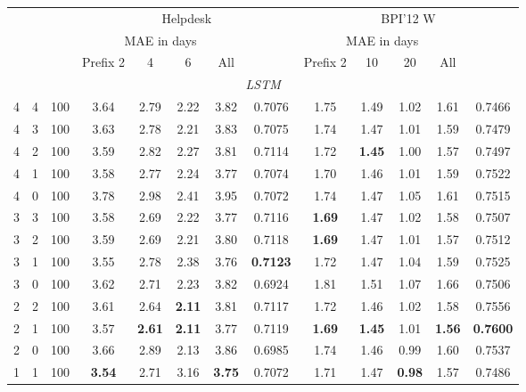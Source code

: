 \documentclass[runningheads,a4paper]{llncs}
\begin{document}
\begin{table}[t]
	\scriptsize
	\centering
	\begin{tabular}{c@{\quad}c@{\quad}cccccc@{\quad}ccccc}
		\toprule
		& & & \multicolumn{5}{c}{Helpdesk} & \multicolumn{5}{c}{BPI'12 W} \\
		\multirow{2}{*}{\raisebox{-\heavyrulewidth}{Layers}} & \multirow{2}{*}{\raisebox{-\heavyrulewidth}{Shared}} & \multirow{2}{*}{\raisebox{-\heavyrulewidth}{N/l}} & \multicolumn{4}{c}{MAE in days}& \multirow{2}{*}{\raisebox{-\heavyrulewidth}{Accuracy}} & \multicolumn{4}{c}{MAE in days} &
		\multirow{2}{*}{\raisebox{-\heavyrulewidth}{Accuracy}}\\
		\cmidrule{4-7} \cmidrule{9-12} 
		&&&Prefix 2 & 4 & 6 & All & & Prefix 2 & 10 & 20 & All &  \\ 
		\midrule
		\multicolumn{13}{c}{\emph{LSTM}}\\
		4 & 4 & 100 & 3.64 & 2.79 & 2.22 & 3.82 & 0.7076 & 1.75 & 1.49& 1.02& 1.61 & 0.7466 \\
		4 & 3 & 100 & 3.63 & 2.78 & 2.21 & 3.83 & 0.7075 & 1.74 & 1.47 & 1.01 & 1.59 & 0.7479 \\
		4 & 2 & 100 & 3.59 & 2.82 & 2.27 & 3.81 & 0.7114 & 1.72 & \textbf{1.45} & 1.00 & 1.57 & 0.7497\\
		4 & 1 & 100 & 3.58 & 2.77 & 2.24 & 3.77 & 0.7074 & 1.70 & 1.46 & 1.01 & 1.59 & 0.7522 \\
		4 & 0 & 100 & 3.78 & 2.98 & 2.41 & 3.95 & 0.7072 & 1.74 & 1.47 & 1.05 & 1.61 & 0.7515\\
		3 & 3 & 100 & 3.58 & 2.69 & 2.22 & 3.77 & 0.7116 & \textbf{1.69} & 1.47 & 1.02 & 1.58 & 0.7507\\
		3 & 2 & 100 & 3.59 & 2.69 & 2.21 & 3.80 & 0.7118 & \textbf{1.69} & 1.47 & 1.01 & 1.57 & 0.7512\\
		3 & 1 & 100 & 3.55 & 2.78 & 2.38 & 3.76 & \textbf{0.7123} & 1.72 & 1.47 & 1.04 & 1.59 & 0.7525\\
		3 & 0 & 100 & 3.62 & 2.71 & 2.23 & 3.82 & 0.6924 & 1.81 & 1.51 & 1.07 & 1.66 & 0.7506\\
		2 & 2 & 100 & 3.61 & 2.64 & \textbf{2.11} & 3.81 & 0.7117 & 1.72 & 1.46 & 1.02 & 1.58 & 0.7556\\
		2 & 1 & 100 & 3.57 & \textbf{2.61} & \textbf{2.11} & 3.77 & 0.7119 & \textbf{1.69} & \textbf{1.45} & 1.01 & \textbf{1.56} & \textbf{0.7600}\\
		2 & 0 & 100 & 3.66 & 2.89 & 2.13 & 3.86 & 0.6985 & 1.74 & 1.46 & 0.99 & 1.60 & 0.7537\\
		1 & 1 & 100 & \textbf{3.54} & 2.71 & 3.16 & \textbf{3.75} & 0.7072 & 1.71 & 1.47 & \textbf{0.98} & 1.57 & 0.7486\\

\end{tabular}
\end{table}
\end{document}
